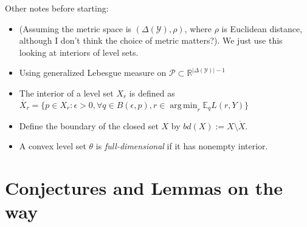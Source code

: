 \documentclass[12pt]{article}
\newcommand{\Comments}{1}
\newcommand{\mytodo}[2]{\ifnum\Comments=1%
  \todo[linecolor=#1!80!black,backgroundcolor=#1,bordercolor=#1!80!black]{#2}\fi}
\newcommand{\raft}[1]{\mytodo{green!20!white}{RF: #1}}
\newcommand{\jessiet}[1]{\mytodo{purple!20!white}{JF: #1}}
\newcommand{\reals}{\mathbb{R}}
\newcommand{\E}{\mathbb{E}}
\renewcommand{\P}{\mathcal{P}}
\newcommand{\Y}{\mathcal{Y}}
\newcommand{\inter}[1]{\mathring{#1}}%
\newcommand{\aff}{\text{aff}}
\DeclareMathOperator*{\argmin}{arg\,min}
\begin{document}
Other notes before starting:
\begin{itemize}
\item (Assuming the metric space is $(\Delta(\Y), \rho)$, where $\rho$ is Euclidean distance, although I don't think the choice of metric matters?).
We just use this looking at interiors of level sets.
\item Using generalized Lebesgue measure on $\P \subset \reals^{|\Delta(\Y)|-1}$
\item The interior of a level set $X_r$ is defined as $\inter{X_r} = \{p \in X_r: \epsilon > 0,  \forall q \in B(\epsilon,p), r \in \argmin_r \E_q L(r,Y)\}$
\item Define the boundary of the closed set $X$ by $bd(X) := X \setminus \inter{X}$.
\item A convex level set $\theta$ is \emph{full-dimensional} if it has nonempty interior. %
\end{itemize}

\section{Conjectures and Lemmas on the way}
\end{document}
